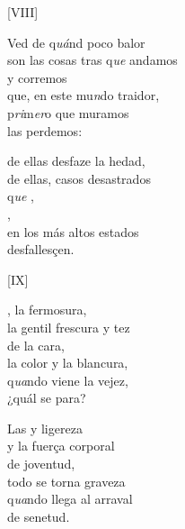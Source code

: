 \documentclass[11pt,a4paper,twoside]{article}
\begin{document}
\begin{center}
	[VIII]
\end{center}
\pstart
Ved de q\textit{uá}nd poco balor\\
son las cosas tras q\textit{ue} andamos\\
y corremos\\
que, en este mu\textit{n}do traidor,\\
 p\textit{ri}m\textit{er}o que muramos\\
las perdemos:\par
de ellas desfaze la hedad,\\
de ellas, casos desastrados\\
q\textit{ue} ,\\
,\\
en los más altos estados\\
desfallesçen.\par
\pend

\begin{center}
	[IX]
\end{center}
\pstart
{}, la fermosura,\\
la gentil frescura y tez\\
de la cara,\\
la color y la blancura,\\
q\textit{ua}ndo viene la vejez,\\
¿quál se para?\par
Las  y ligereza\\
y la fuerça corporal\\
de joventud,\\
todo se torna graveza\\
q\textit{ua}ndo llega al arraval \\
de senetud.\par
\pend
\end{document}
